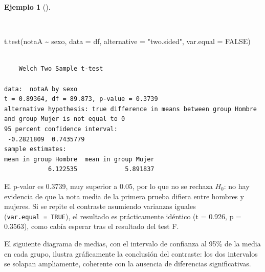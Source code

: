 \documentclass[
  spanish,
  a4paper,
]{scrreport}
\newenvironment{Shaded}{\begin{snugshade}}{\end{snugshade}}
\newcommand{\AttributeTok}[1]{\textcolor[rgb]{0.40,0.45,0.13}{#1}}
\newcommand{\ConstantTok}[1]{\textcolor[rgb]{0.56,0.35,0.01}{#1}}
\newcommand{\FunctionTok}[1]{\textcolor[rgb]{0.28,0.35,0.67}{#1}}
\newcommand{\NormalTok}[1]{\textcolor[rgb]{0.00,0.23,0.31}{#1}}
\newcommand{\SpecialCharTok}[1]{\textcolor[rgb]{0.37,0.37,0.37}{#1}}
\newcommand{\StringTok}[1]{\textcolor[rgb]{0.13,0.47,0.30}{#1}}
\theoremstyle{definition}
\newtheorem{example}{Ejemplo}[chapter]
\theoremstyle{definition}
\theoremstyle{remark}
\begin{document}
\begin{example}[]\protect\hypertarget{exm-dosindep-test-t}{}\label{exm-dosindep-test-t}

~

\begin{Shaded}
\begin{Highlighting}[]
\FunctionTok{t.test}\NormalTok{(notaA }\SpecialCharTok{\textasciitilde{}}\NormalTok{ sexo, }\AttributeTok{data =}\NormalTok{ df, }\AttributeTok{alternative =} \StringTok{"two.sided"}\NormalTok{, }\AttributeTok{var.equal =} \ConstantTok{FALSE}\NormalTok{)}
\end{Highlighting}
\end{Shaded}

\begin{verbatim}

    Welch Two Sample t-test

data:  notaA by sexo
t = 0.89364, df = 89.873, p-value = 0.3739
alternative hypothesis: true difference in means between group Hombre and group Mujer is not equal to 0
95 percent confidence interval:
 -0.2821809  0.7435779
sample estimates:
mean in group Hombre  mean in group Mujer 
            6.122535             5.891837 
\end{verbatim}

El p-valor es 0.3739, muy superior a 0.05, por lo que no se rechaza
\(H_0\): no hay evidencia de que la nota media de la primera prueba
difiera entre hombres y mujeres. Si se repite el contraste asumiendo
varianzas iguales (\texttt{var.equal\ =\ TRUE}), el resultado es
prácticamente idéntico (t = 0.926, p = 0.3563), como cabía esperar tras
el resultado del test F.

\end{example}

El siguiente diagrama de medias, con el intervalo de confianza al 95\%
de la media en cada grupo, ilustra gráficamente la conclusión del
contraste: los dos intervalos se solapan ampliamente, coherente con la
ausencia de diferencias significativas.
\end{document}
